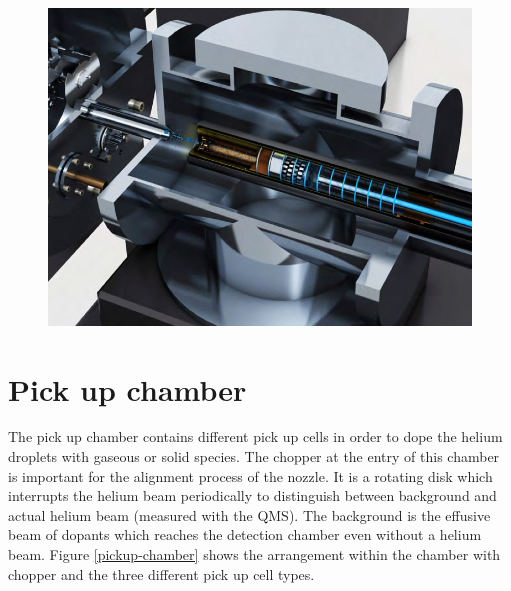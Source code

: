 \documentclass[parskip,12pt,headsepline,a4paper] {scrbook}
\begin{document}
\begin{figure}[ht]
\centerline{
\includegraphics[width=12cm]{./experimental_setup/pre_cooling.jpg}}
\end{figure}


\section{Pick up chamber}
\vspace{-1\baselineskip}
The pick up chamber contains different pick up cells in order to dope the helium droplets with gaseous or solid species. The chopper at the entry of this chamber is important for the alignment process of the nozzle. It is a rotating disk which interrupts the helium beam periodically to distinguish between background and actual helium beam (measured with the QMS). The background is the effusive beam of dopants which reaches the detection chamber even without a helium beam. %
Figure \ref{pickup-chamber} shows the arrangement within the chamber with chopper and the three different pick up cell types.
\end{document}
